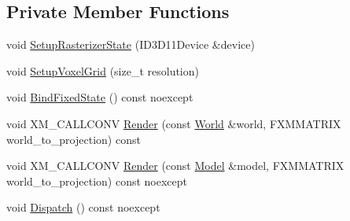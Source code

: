\subsection*{Private Member Functions}
\begin{DoxyCompactItemize}
\item 
void \hyperlink{classmage_1_1rendering_1_1_voxelization_pass_a7f8af2ecd3eb69f4f052be7b9ce67650}{Setup\+Rasterizer\+State} (I\+D3\+D11\+Device \&device)
\item 
void \hyperlink{classmage_1_1rendering_1_1_voxelization_pass_a09f3b3c1a08b28c3815fb4fa1f0611f5}{Setup\+Voxel\+Grid} (size\+\_\+t resolution)
\item 
void \hyperlink{classmage_1_1rendering_1_1_voxelization_pass_ae69d6465ab918f12940339436fe56c56}{Bind\+Fixed\+State} () const noexcept
\item 
void X\+M\+\_\+\+C\+A\+L\+L\+C\+O\+NV \hyperlink{classmage_1_1rendering_1_1_voxelization_pass_a1f29b02c3e4557518c78dad993d3e482}{Render} (const \hyperlink{classmage_1_1rendering_1_1_world}{World} \&world, F\+X\+M\+M\+A\+T\+R\+IX world\+\_\+to\+\_\+projection) const
\item 
void X\+M\+\_\+\+C\+A\+L\+L\+C\+O\+NV \hyperlink{classmage_1_1rendering_1_1_voxelization_pass_aa993ec5ff093f3948f13bf3187a11e6c}{Render} (const \hyperlink{classmage_1_1rendering_1_1_model}{Model} \&model, F\+X\+M\+M\+A\+T\+R\+IX world\+\_\+to\+\_\+projection) const noexcept
\item 
void \hyperlink{classmage_1_1rendering_1_1_voxelization_pass_a5026abcbe3aad3627e96ee055df8b842}{Dispatch} () const noexcept
\end{DoxyCompactItemize}
